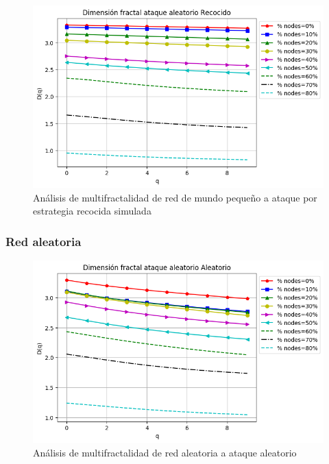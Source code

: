 \begin{figure}[H]
    \centering
    \includegraphics[scale=0.7]{Capitulo6MultifractalidadYRobustez/imagenes/grafica_DqSimulated20180510_143549SmallWorld5000NodesRewire01.png}
    \caption{Análisis de multifractalidad de red de mundo pequeño a ataque por estrategia recocida simulada }
\end{figure}

\subsubsection{Red aleatoria}
\begin{figure}[H]
    \centering
    \includegraphics[scale=0.7]{Capitulo6MultifractalidadYRobustez/imagenes/grafica_DqRandom20180501_072543Random1991Nodes5939.png}
    \caption{Análisis de multifractalidad de red aleatoria a ataque aleatorio }
\end{figure}

